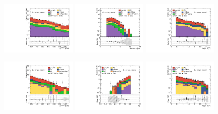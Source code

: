 \begin{figure}[ht!]
  \begin{center}

    \includegraphics[width=0.32\textwidth]{images/results/fr2_unblind/can_VRQ_ph_pt0_afterFit.pdf}
    \includegraphics[width=0.32\textwidth]{images/results/fr2_unblind/can_VRQ_jet_n_afterFit.pdf}
    \includegraphics[width=0.32\textwidth]{images/results/fr2_unblind/can_VRQ_dphi_jetmet_afterFit.pdf}

    \includegraphics[width=0.32\textwidth]{images/results/fr2_unblind/can_VRM1L_ph_pt0_afterFit.pdf}
    \includegraphics[width=0.32\textwidth]{images/results/fr2_unblind/can_VRM1L_rt4_afterFit.pdf}
    \includegraphics[width=0.32\textwidth]{images/results/fr2_unblind/can_VRM1L_dphi_jetmet_afterFit.pdf}


\end{center}
\end{figure}
